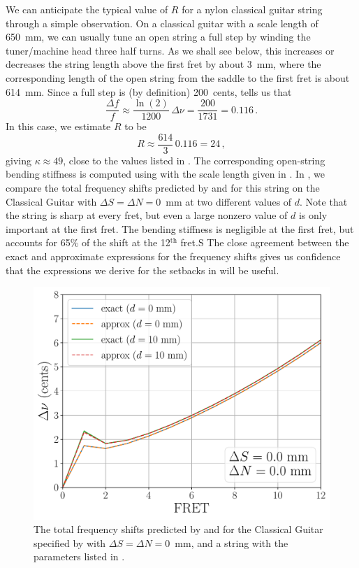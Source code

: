We can anticipate the typical value of $R$ for a nylon classical guitar string through a simple observation. On a classical guitar with a scale length of 650~mm, we can usually tune an open string a full step by winding the tuner/machine head three half turns. As we shall see below, this increases or decreases the string length above the first fret by about 3~mm, where the corresponding length of the open string from the saddle to the first fret is about 614~mm. Since a full step is (by definition) 200~cents,  tells us that
\begin{equation}
  \frac{\Delta f}{f} \approx \frac{\ln(2)}{1200}\, \Delta \nu = \frac{200}{1731} = 0.116\, .
\end{equation}
In this case, we estimate $R$ to be
\begin{equation}
  R \approx \frac{614}{3}\, 0.116 = 24\, ,
\end{equation}
giving $\kappa \approx 49$, close to the values listed in . The corresponding open-string bending stiffness is computed using  with the scale length given in . In , we compare the total frequency shifts predicted by  and  for this string on the Classical Guitar with $\Delta S = \Delta N = 0$~mm at two different values of $d$. Note that the string is sharp at every fret, but even a large nonzero value of $d$ is only important at the first fret. The bending stiffness is negligible at the first fret, but accounts for 65\% of the shift at the 12$^\textrm{th}$ fret.S The close agreement between the exact and approximate expressions for the frequency shifts gives us confidence that the expressions we derive for the setbacks in  will be useful.

\begin{figure}
  \centering
  \includegraphics[width=5.0in]{figures/uncomp}
  \caption{\label{fig:uncomp} The total frequency shifts predicted by  and  for the Classical Guitar specified by  with $\Delta S = \Delta N = 0$~mm, and a string with the parameters listed in .}
\end{figure}


